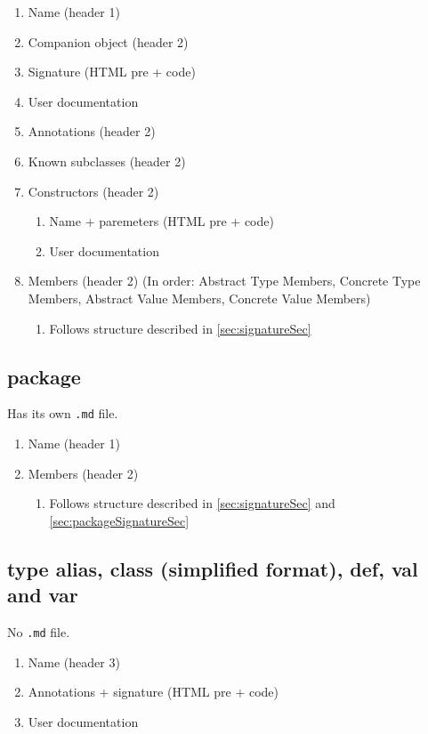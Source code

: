 \documentclass{report}
\begin{document}
\begin{enumerate}
    \item Name (header 1)
    \item Companion object (header 2)
    \item Signature (HTML pre + code)
    \item User documentation
    \item Annotations (header 2)
    \item Known subclasses (header 2)
    \item Constructors (header 2)
    \begin{enumerate}
        \item Name + paremeters (HTML pre + code)
        \item User documentation
    \end{enumerate}
    \item Members (header 2) (In order: Abstract Type Members, Concrete Type Members, Abstract Value Members, Concrete Value Members)
    \begin{enumerate}
        \item Follows structure described in \autoref{sec:signatureSec}
    \end{enumerate}
\end{enumerate}

\subsection{package}
Has its own \texttt{.md} file.

\begin{enumerate}
    \item Name (header 1)
    \item Members (header 2)
    \begin{enumerate}
        \item Follows structure described in \autoref{sec:signatureSec} and \autoref{sec:packageSignatureSec}
    \end{enumerate}
\end{enumerate}

\subsection{type alias, class (simplified format), def, val and var}
No \texttt{.md} file.

\label{sec:signatureSec}
\begin{enumerate}
    \item Name (header 3)
    \item Annotations + signature (HTML pre + code)
    \item User documentation
\end{enumerate}
\end{document}
